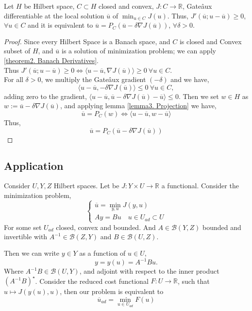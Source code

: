 \begin{theorem}
Let $H$ be Hilbert space, $C \subset H$ closed and convex, $J: C \rightarrow \mathbb{R}$, Gate\^aux differentiable at the local solution $\overline{u}$ of $\min_{u\in C} J(u)$. Thus, $J'(\overline{u};u-\overline{u}) \geq 0$, $\forall u \in C$ and it is equivalent to $ \overline{u}=P_C(\overline{u}-\delta\nabla J(\overline{u}))$, $\forall \delta >0$. 
\begin{proof} 
Since every Hilbert Space is a Banach space, and $C$ is closed and Convex subset of $H$, and $\overline{u}$ is a solution of minimization problem; we can apply \ref{theorem2. Banach Derivatives}.\\
 Thus	$J'\left(\overline{u}; u-\overline{u}\right)\geq 0 \iff \langle u-\overline{u}, \nabla J(\overline{u})\rangle \geq 0 \ \forall u \in C$. \\
For all $\delta >0$, we multiply the Gate\^aux gradient  $(-\delta)$ and we have,
\[\langle u-\overline{u}, -\delta \nabla J(\overline{u}) \rangle \leq 0 \ \forall u \in C,\] adding zero to the gradient, $ \langle u-\overline{u}, \overline{u}-\delta\nabla J(\overline{u})-\overline{u}\rangle \leq 0$. Then we set $w \in H$ as $w:= \overline{u}-\delta  \nabla J(\overline{u})$, and applying lemma \ref{lemma3. Projection} we have,
\[
	\overline{u}=P_C(w)	\iff \langle u -\overline{u},w-\overline{u}\rangle
\]
Thus, 
	\[
		\overline{u}=P_C(\overline{u}-\delta \nabla J(\overline{u}))
	\]
\end{proof}
\end{theorem}
\subsection{Application}
Consider $U, Y, Z$ Hilbert spaces. Let be  $J: Y\times U \rightarrow \mathbb{R}$ a functional. Consider the minimization problem,
\begin{equation*}
	\left\lbrace
	\begin{array}{l}
	\overline{u}=\underset{y,u}{\min} J(y,u) \\
	Ay=Bu \quad u \in U_{ad} \subset U
	\end{array}
	\right.
\end{equation*}
For some set $U_{ad}$ closed, convex and bounded. And $A \in \mathcal{B}(Y,Z)$ bounded and invertible with $A^{-1}\in \mathcal{B}(Z, Y)$ and $B\in \mathcal{B}(U, Z)$.

Then we can write $y \in Y$ as a function of $u \in U$,
\[
y=y(u)=A^{-1}Bu.
\]
Where $A^{-1}B \in \mathcal{B}(U, Y)$, and adjoint with respect to the inner product $(A^{-1}B)^\star$. Consider the reduced cost functional  $F:U\rightarrow \mathbb{R}$, such that $u\mapsto J(y(u), u)$, then our problem is equivalent to
\[
	\overline{u}_{ad}=\min_{u \in U_{ad}} F(u) 
\]

